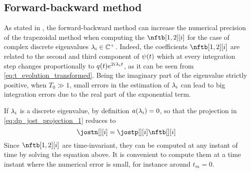 \subsection{Forward-backward method}\label{ssec:forward-backward_method}
As stated in \cite{Aref2016c}, the forward-backward method can increase the numerical precision of the trapezoidal method when computing the $\nftb[1,2][i]$ for the case of complex discrete eigenvalues $\eig[i] \in \CC^+$.
Indeed, the coefficients $\nftb[1,2][i]$ are related to the second and third component of $\psisol(\nttm)$ which at every
integration step changes proportionally to $\nflds e^{2\iunit\eig[i]\nttm}$, as it can be seen from \eqref{eq:t_evolution_transformed}. Being the imaginary part of
the eigenvalue strictly positive, when $T_0\gg1$, small errors in the
estimation of $\eig[i]$ can lead to big integration errors due to the real part of the exponential term.

If $\eig[i]$ is a discrete eigenvalue, by definition $\nfta[i] = 0$, so that the projection in \eqref{eq:dp_jost_projection_1} reduces to
\begin{equation}\label{eq:fb_system}
  \jostn[][i]=\jostp[][i] \nftb[][i]
\end{equation}
Since $\nftb[1,2][i]$ are time-invariant, they can be computed at any instant of time by solving the equation above. It is convenient to compute them at a time
instant where the numerical error is small, for instance around $t_m = 0$.

